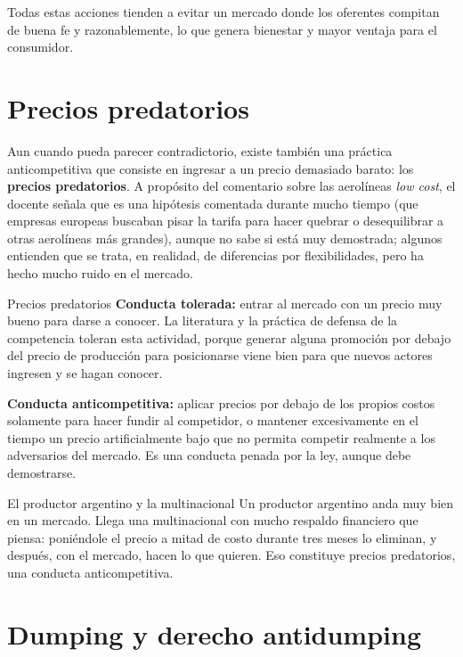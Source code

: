 \documentclass[12pt,oneside]{book}
\begin{document}
Todas estas acciones tienden a evitar un mercado donde los oferentes compitan de buena fe y razonablemente, lo que genera bienestar y mayor ventaja para el consumidor.

\section{Precios predatorios}

Aun cuando pueda parecer contradictorio, existe también una práctica anticompetitiva que consiste en ingresar a un precio demasiado barato: los \textbf{precios predatorios}. A propósito del comentario sobre las aerolíneas \textit{low cost}, el docente señala que es una hipótesis comentada durante mucho tiempo (que empresas europeas buscaban pisar la tarifa para hacer quebrar o desequilibrar a otras aerolíneas más grandes), aunque no sabe si está muy demostrada; algunos entienden que se trata, en realidad, de diferencias por flexibilidades, pero ha hecho mucho ruido en el mercado.

\begin{definition}{Precios predatorios}
\textbf{Conducta tolerada:} entrar al mercado con un precio muy bueno para darse a conocer. La literatura y la práctica de defensa de la competencia toleran esta actividad, porque generar alguna promoción por debajo del precio de producción para posicionarse viene bien para que nuevos actores ingresen y se hagan conocer.

\textbf{Conducta anticompetitiva:} aplicar precios por debajo de los propios costos solamente para hacer fundir al competidor, o mantener excesivamente en el tiempo un precio artificialmente bajo que no permita competir realmente a los adversarios del mercado. Es una conducta penada por la ley, aunque debe demostrarse.
\end{definition}

\begin{example}{El productor argentino y la multinacional}
Un productor argentino anda muy bien en un mercado. Llega una multinacional con mucho respaldo financiero que piensa: poniéndole el precio a mitad de costo durante tres meses lo eliminan, y después, con el mercado, hacen lo que quieren. Eso constituye precios predatorios, una conducta anticompetitiva.
\end{example}

\section{Dumping y derecho antidumping}
\end{document}
